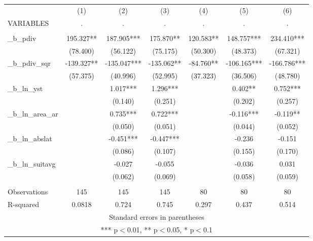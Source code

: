 \documentclass[]{article}
\begin{document}
\begin{tabular}{lcccccc} \hline
 & (1) & (2) & (3) & (4) & (5) & (6) \\
VARIABLES & . & . & . & . & . & . \\ \hline
 &  &  &  &  &  &  \\
\_b\_pdiv & 195.327** & 187.905*** & 175.870** & 120.583** & 148.757*** & 234.410*** \\
 & (78.400) & (56.122) & (75.175) & (50.300) & (48.373) & (67.321) \\
\_b\_pdiv\_sqr & -139.327** & -135.047*** & -135.062** & -84.760** & -106.165*** & -166.786*** \\
 & (57.375) & (40.996) & (52.995) & (37.323) & (36.506) & (48.780) \\
\_b\_ln\_yst &  & 1.017*** & 1.296*** &  & 0.402** & 0.752*** \\
 &  & (0.140) & (0.251) &  & (0.202) & (0.257) \\
\_b\_ln\_area\_ar &  & 0.735*** & 0.722*** &  & -0.116*** & -0.119** \\
 &  & (0.050) & (0.051) &  & (0.044) & (0.052) \\
\_b\_ln\_abslat &  & -0.451*** & -0.447*** &  & -0.236 & -0.151 \\
 &  & (0.086) & (0.107) &  & (0.155) & (0.170) \\
\_b\_ln\_suitavg &  & -0.027 & -0.055 &  & -0.036 & 0.031 \\
 &  & (0.062) & (0.069) &  & (0.058) & (0.059) \\
 &  &  &  &  &  &  \\
Observations & 145 & 145 & 145 & 80 & 80 & 80 \\
 R-squared & 0.0818 & 0.724 & 0.745 & 0.297 & 0.437 & 0.514 \\ \hline
\multicolumn{7}{c}{ Standard errors in parentheses} \\
\multicolumn{7}{c}{ *** p$<$0.01, ** p$<$0.05, * p$<$0.1} \\
\end{tabular}
\end{document}
